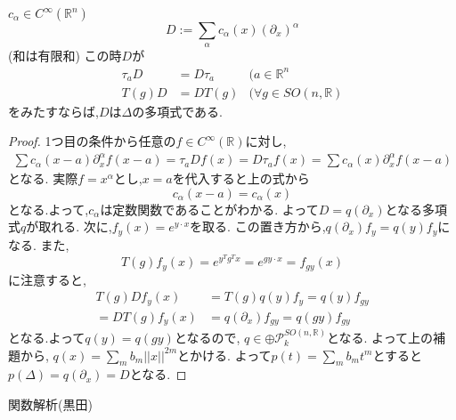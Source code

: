 \documentclass[uplatex]{jsbook}
\begin{document}
\begin{thm}
 $c_{\alpha} \in C^{\infty}(\mathbb{R}^n)$
 \begin{equation*}
  D:= \sum_{\alpha}  c_{\alpha}(x)(\partial_x)^{\alpha}
 \end{equation*}
 (和は有限和)
この時$D$が
\begin{align*}
\tau_{a} D & = D\tau_{a}  & (a \in \mathbb{R}^n  \\
T(g)D &  = DT(g)  & (\forall g \in SO(n, \mathbb{R})
\end{align*}
をみたすならば,$D$は$\Delta$の多項式である.
\end{thm}
\begin{proof}
1つ目の条件から任意の$f \in C^{\infty}(\mathbb{R})$に対し,
\begin{align*}
    \sum c_{\alpha}(x -a) \partial_x^{\alpha}f(x -a ) = \tau_a D f(x) = D \tau_a f(x) = \sum c_{\alpha}(x) \partial_x^{\alpha}f(x -a )
\end{align*}
となる.
実際$f= x^{\alpha}$とし,$x=a$を代入すると上の式から
\begin{equation*}
    c_{\alpha}(x -a) = c_{\alpha}(x)
\end{equation*}
となる.よって,$c_{\alpha}$は定数関数であることがわかる.
よって$D = q(\partial_x)$となる多項式$q$が取れる.
次に,$f_y(x) = e^{y \cdot x}$を取る.
この置き方から,$q(\partial_x)f_y = q(y) f_y$になる.
また,
\begin{equation*}
T(g) f_y(x) = e^{y^Tg^Tx} =  e^{gy \cdot x} = f_{gy}(x)
\end{equation*} 
に注意すると,
\begin{align*}
    T(g)D f_y(x) & = T(g) q(y) f_y = q(y) f_{gy}  \\
    = DT(g) f_y(x) & =q(\partial_x) f_{gy} = q(gy) f_{gy}
\end{align*}
となる.よって$q(y) = q(gy)$となるので,
$q \in \oplus \mathcal{P}_k^{SO(n, \mathbb{R})}$となる.
よって上の補題から,
$q(x) =  \sum_m b_m ||x||^{2m}$とかける.
よって$p(t) = \sum_m b_m t^m$とすると
$p(\Delta) = q(\partial_x) = D$となる.
\end{proof}

\begin{thebibliography}{99}
  関数解析(黒田)
\end{thebibliography}
\end{document}
